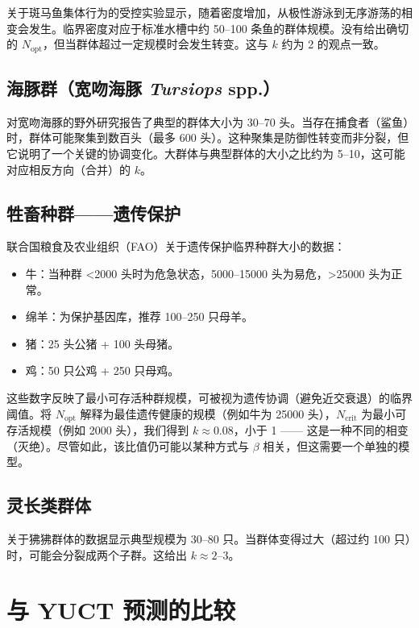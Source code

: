\documentclass[12pt]{article}
\theoremstyle{remark}
\begin{document}
	关于斑马鱼集体行为的受控实验\cite{Tunstrom2013}显示，随着密度增加，从极性游泳到无序游荡的相变会发生。临界密度对应于标准水槽中约 50–100 条鱼的群体规模。没有给出确切的 $N_{\text{opt}}$，但当群体超过一定规模时会发生转变。这与 $k$ 约为 2 的观点一致。
	
	\subsection{海豚群（宽吻海豚 \textit{Tursiops} spp.）}
	\label{subsec:dolphins}
	
	对宽吻海豚的野外研究\cite{Connor2000}报告了典型的群体大小为 30–70 头。当存在捕食者（鲨鱼）时，群体可能聚集到数百头（最多 600 头）。这种聚集是防御性转变而非分裂，但它说明了一个关键的协调变化。大群体与典型群体的大小之比约为 5–10，这可能对应相反方向（合并）的 $k$。
	
	\subsection{牲畜种群——遗传保护}
	\label{subsec:livestock}
	
	联合国粮食及农业组织（FAO）关于遗传保护临界种群大小的数据\cite{FAO2013}：
	\begin{itemize}
		\item 牛：当种群 <2000 头时为危急状态，5000–15000 头为易危，>25000 头为正常。
		\item 绵羊：为保护基因库，推荐 100–250 只母羊。
		\item 猪：25 头公猪 + 100 头母猪。
		\item 鸡：50 只公鸡 + 250 只母鸡。
	\end{itemize}
	这些数字反映了最小可存活种群规模，可被视为遗传协调（避免近交衰退）的临界阈值。将 $N_{\text{opt}}$ 解释为最佳遗传健康的规模（例如牛为 25000 头），$N_{\text{crit}}$ 为最小可存活规模（例如 2000 头），我们得到 $k \approx 0.08$，小于 1 —— 这是一种不同的相变（灭绝）。尽管如此，该比值仍可能以某种方式与 $\beta$ 相关，但这需要一个单独的模型。
	
	\subsection{灵长类群体}
	\label{subsec:primates}
	
	关于狒狒群体的数据\cite{Alberts1995}显示典型规模为 30–80 只。当群体变得过大（超过约 100 只）时，可能会分裂成两个子群。这给出 $k \approx 2$–$3$。
	
	\section{与 YUCT 预测的比较}
	\label{sec:comparison}
	
\end{document}
